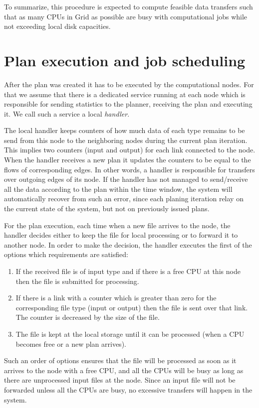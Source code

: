 \documentclass{svjour3}                     %
\begin{document}
To summarize, this procedure is expected to compute feasible data transfers 
such that as many CPUs in Grid as possible are busy with computational jobs while not exceeding local disk capacities.

\section{Plan execution and job scheduling}
\label{plan-execution}
After the plan was created it has to be executed by the computational
nodes. For that we assume that there is a dedicated service running at each node
which is responsible for sending statistics to the planner, receiving the plan and executing it. We call such a service a local \textit{handler}.

The local handler keeps counters of how much data of each type remains to be send from this node to the neighboring nodes during the current plan iteration. This implies two counters (input and output) for each link connected to the node. When the handler receives a new plan it updates the counters to be equal to the flows of corresponding edges. In other words, a handler is responsible for transfers over outgoing edges of its node. If the handler has not managed to send/receive all the data according to the plan within the time window, the system will automatically recover from such an error, since each planing iteration relay on the current state of the system, but not on previously issued plans.  

For the plan execution, each time when a new file arrives to the node, the handler decides either to keep the file for local processing or to forward it to another node. In order to make the decision, the handler executes the first of the options which requirements are satisfied:

\begin{enumerate}
\item If the received file is of input type and if there is a free CPU at this node then the file is submitted for processing.
\item If there is a link with a counter which is greater than zero for the corresponding file type (input or output) then the file is sent over that link. The counter is decreased by the size of the file.
\item The file is kept at the local storage until it can be processed (when a CPU becomes free  or a new plan arrives).
\end{enumerate}
Such an order of options ensures that the file will be processed as soon as it arrives to the node with a free CPU, and all the CPUs will be busy as long as there are unprocessed input files at the node. Since an input file will not be forwarded unless all the CPUs are busy, no excessive transfers will happen in the system.
\end{document}
